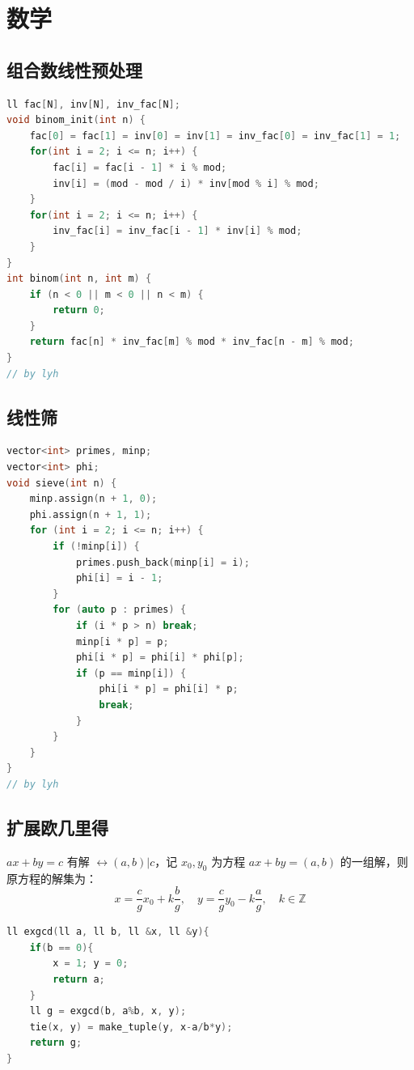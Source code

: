 \section{数学}

\subsection{组合数线性预处理}

\begin{lstlisting}[language=C++]
ll fac[N], inv[N], inv_fac[N];
void binom_init(int n) {
    fac[0] = fac[1] = inv[0] = inv[1] = inv_fac[0] = inv_fac[1] = 1;
    for(int i = 2; i <= n; i++) {
        fac[i] = fac[i - 1] * i % mod;
        inv[i] = (mod - mod / i) * inv[mod % i] % mod;
    }
    for(int i = 2; i <= n; i++) {
        inv_fac[i] = inv_fac[i - 1] * inv[i] % mod;
    }
}
int binom(int n, int m) {
    if (n < 0 || m < 0 || n < m) {
        return 0;
    }
    return fac[n] * inv_fac[m] % mod * inv_fac[n - m] % mod;
}
// by lyh
\end{lstlisting}

\subsection{线性筛}

\begin{lstlisting}[language=C++]
vector<int> primes, minp;
vector<int> phi;
void sieve(int n) {
    minp.assign(n + 1, 0);
    phi.assign(n + 1, 1);
    for (int i = 2; i <= n; i++) {
        if (!minp[i]) {
            primes.push_back(minp[i] = i);
            phi[i] = i - 1;
        }
        for (auto p : primes) {
            if (i * p > n) break;
            minp[i * p] = p;
            phi[i * p] = phi[i] * phi[p];
            if (p == minp[i]) {
                phi[i * p] = phi[i] * p;
                break;
            }
        }
    }
}
// by lyh
\end{lstlisting}

\subsection{扩展欧几里得}

$ax+by=c$ 有解 $\leftrightarrow (a,b)|c$，记 $x_0, y_0$ 为方程 $ax+by=(a,b)$ 的一组解，则原方程的解集为：
\[
    x = \dfrac{c}{g}x_0+k\dfrac{b}{g},\quad y = \dfrac{c}{g}y_0-k\dfrac{a}{g},\quad k\in \mathbb{Z}
\]

\begin{lstlisting}[language = C++]
ll exgcd(ll a, ll b, ll &x, ll &y){
    if(b == 0){
        x = 1; y = 0;
        return a;
    }
    ll g = exgcd(b, a%b, x, y);
    tie(x, y) = make_tuple(y, x-a/b*y);
    return g;
}
\end{lstlisting}

